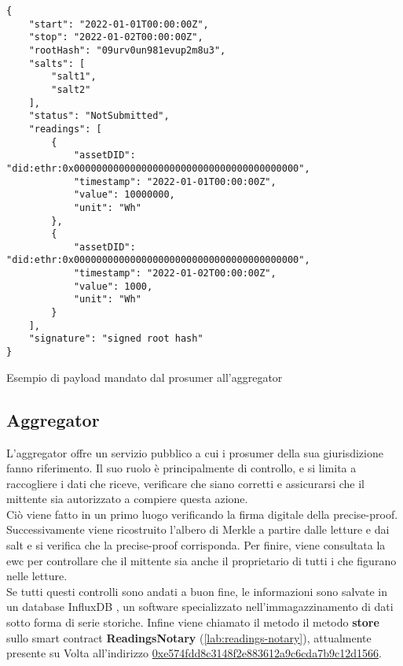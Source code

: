 \begin{listing}[h]
    \begin{verbatim}
{
    "start": "2022-01-01T00:00:00Z",
    "stop": "2022-01-02T00:00:00Z",
    "rootHash": "09urv0un981evup2m8u3",
    "salts": [
        "salt1",
        "salt2"
    ],
    "status": "NotSubmitted",
    "readings": [
        {
            "assetDID": "did:ethr:0x0000000000000000000000000000000000000000",
            "timestamp": "2022-01-01T00:00:00Z",
            "value": 10000000,
            "unit": "Wh"
        },
        {
            "assetDID": "did:ethr:0x0000000000000000000000000000000000000000",
            "timestamp": "2022-01-02T00:00:00Z",
            "value": 1000,
            "unit": "Wh"
        }
    ],
    "signature": "signed root hash"
}
\end{verbatim}
    \caption{Esempio di payload mandato dal \gls{prosumer} all'\gls{aggregator}}\label{lab:prosumer-payload}
\end{listing}

\subsection{Aggregator}
L'\gls{aggregator} offre un servizio pubblico a cui i \gls{prosumer} della sua giurisdizione fanno riferimento.
Il suo ruolo è principalmente di controllo, e si limita a raccogliere i dati che riceve, verificare che siano corretti e
assicurarsi che il mittente sia autorizzato a compiere questa azione. \\
Ciò viene fatto in un primo luogo verificando la firma digitale della precise-proof.
Successivamente viene ricostruito l'albero di Merkle a partire dalle letture e dai salt e si verifica che la precise-proof corrisponda.
Per finire, viene consultata la \gls{ewc} per controllare che il mittente sia anche il proprietario di tutti i  che figurano nelle letture. \\
Se tutti questi controlli sono andati a buon fine, le informazioni sono salvate in un database InfluxDB \cite{sftw:influxdb}, un software specializzato nell'immagazzinamento di dati sotto forma di serie storiche.
Infine viene chiamato il metodo il metodo \textbf{store} sullo smart contract \textbf{ReadingsNotary} (\autoref{lab:readings-notary}), attualmente presente su Volta all'indirizzo \href{https://volta-explorer.energyweb.org/address/0xe574fDD8C3148f2E883612A9C6CDA7b9C12d1566/transactions}{0xe574fdd8c3148f2e883612a9c6cda7b9c12d1566}.

